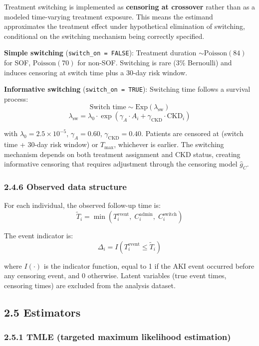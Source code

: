 \documentclass[
  letterpaper,
  DIV=11,
  numbers=noendperiod]{scrartcl}
\begin{document}
Treatment switching is implemented as \textbf{censoring at crossover}
rather than as a modeled time-varying treatment exposure. This means the
estimand approximates the treatment effect under hypothetical
elimination of switching, conditional on the switching mechanism being
correctly specified.

\textbf{Simple switching} (\texttt{switch\_on\ =\ FALSE}): Treatment
duration \(\sim \text{Poisson}(84)\) for SOF, \(\text{Poisson}(70)\) for
non-SOF. Switching is rare (3\% Bernoulli) and induces censoring at
switch time plus a 30-day risk window.

\textbf{Informative switching} (\texttt{switch\_on\ =\ TRUE}): Switching
time follows a survival process:
\[\text{Switch time} \sim \text{Exp}(\lambda_{\text{sw}})\]
\[\lambda_{\text{sw}} = \lambda_0 \cdot \exp(\gamma_A \cdot A_i + \gamma_{\text{CKD}} \cdot \text{CKD}_i)\]

with \(\lambda_0 = 2.5 \times 10^{-5}\), \(\gamma_A = 0.60\),
\(\gamma_{\text{CKD}} = 0.40\). Patients are censored at (switch time +
30-day risk window) or \(T_{\max}\), whichever is earlier. The switching
mechanism depends on both treatment assignment and CKD status, creating
informative censoring that requires adjustment through the censoring
model \(\hat{g}_C\).

\subsubsection{2.4.6 Observed data
structure}\label{observed-data-structure}

For each individual, the observed follow-up time is:
\[\tilde{T}_i = \min(T_i^{\text{event}},\; C_i^{\text{admin}},\; C_i^{\text{switch}})\]

The event indicator is:
\[\Delta_i = I(T_i^{\text{event}} \leq \tilde{T}_i)\]

where \(I(\cdot)\) is the indicator function, equal to 1 if the AKI
event occurred before any censoring event, and 0 otherwise. Latent
variables (true event times, censoring times) are excluded from the
analysis dataset.

\subsection{2.5 Estimators}\label{estimators}

\subsubsection{2.5.1 TMLE (targeted maximum likelihood
estimation)}\label{tmle-targeted-maximum-likelihood-estimation}
\end{document}
